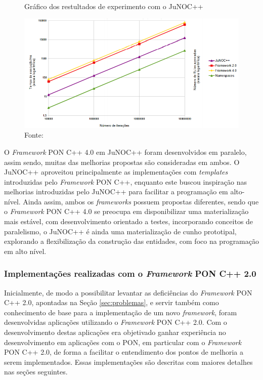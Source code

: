 \begin{figure}[!htb]
  \centering
  \caption{Gráfico dos restultados de experimento com o JuNOC++}
  \includegraphics[width=.85\textwidth]{../figures/junoc_graph.png}
  \caption*{Fonte: }
  \label{fig:exp_junoc}
\end{figure}

O \textit{Framework} PON C++ 4.0 em JuNOC++ foram desenvolvidos em paralelo,
assim sendo, muitas das melhorias propostas são consideradas em ambos. O JuNOC++
aproveitou principalmente as implementações com \textit{templates} introduzidas
pelo \textit{Framework} PON C++, enquanto este buscou inspiração nas melhorias
introduzidas pelo JuNOC++ para facilitar a programação em alto-nível. Ainda
assim, ambos os \textit{frameworks} possuem propostas diferentes, sendo que o
\textit{Framework} PON C++ 4.0 se preocupa em disponibilizar uma materialização
mais estável, com desenvolvimento orientado a testes, incorporando conceitos de
paralelismo, o JuNOC++ é ainda uma materialização de cunho prototipal,
explorando a flexibilização da construção das entidades, com foco na programação
em alto nível.

\subsubsection{Implementações realizadas com o \textit{Framework} PON C++
  2.0}\label{sec:ex_fw2}

Inicialmente, de modo a possibilitar levantar as deficiências do
\textit{Framework} PON C++ 2.0, apontadas na Seção \ref{sec:problemas}, e servir
também como conhecimento de base para a implementação de um novo
\textit{framework}, foram desenvolvidas aplicações utilizando o
\textit{Framework} PON C++ 2.0. Com o desenvolvimento destas aplicações era
objetivado ganhar experiência no desenvolvimento em aplicações com o PON, em
particular com o \textit{Framework} PON C++ 2.0, de forma a facilitar o
entendimento dos pontos de melhoria a serem implementados. Essas implementações
são descritas com maiores detalhes nas seções seguintes.

